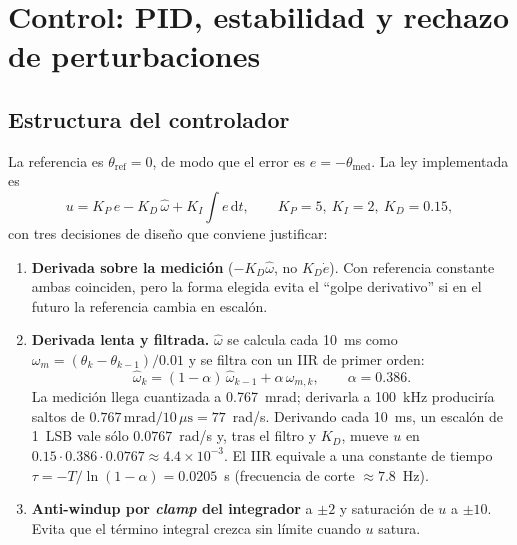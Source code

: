\documentclass[11pt,a4paper]{article}
\newcommand{\dd}{\mathrm{d}}
\begin{document}
\section{Control: PID, estabilidad y rechazo de perturbaciones}\label{sec:control}
\subsection{Estructura del controlador}
La referencia es $\theta_{\mathrm{ref}}=0$, de modo que el error es $e=-\theta_{\mathrm{med}}$. La
ley implementada es
\begin{equation}
u = K_P\,e - K_D\,\hat\omega + K_I\!\int e\,\dd t,\qquad
K_P=5,\ K_I=2,\ K_D=0.15 ,
\end{equation}
con tres decisiones de dise\~no que conviene justificar:

\begin{enumerate}[leftmargin=1.6em]
\item \textbf{Derivada sobre la medici\'on} ($-K_D\hat\omega$, no $K_D\dot e$). Con
referencia constante ambas coinciden, pero la forma elegida evita el ``golpe derivativo''
si en el futuro la referencia cambia en escal\'on.
\item \textbf{Derivada lenta y filtrada.} $\hat\omega$ se calcula cada 10~ms como
$\omega_m=(\theta_k-\theta_{k-1})/0.01$ y se filtra con un IIR de primer orden:
\begin{equation}
\hat\omega_k=(1-\alpha)\,\hat\omega_{k-1}+\alpha\,\omega_{m,k},\qquad \alpha=0.386 .
\label{eq:iir}
\end{equation}
La medici\'on llega cuantizada a 0.767~mrad; derivarla a 100~kHz producir\'ia saltos de
$0.767\,\mathrm{mrad}/10\,\mu\mathrm{s}=77$~rad/s. Derivando cada 10~ms, un escal\'on de
1~LSB vale s\'olo $0.0767$~rad/s y, tras el filtro y $K_D$, mueve $u$ en
$0.15\cdot0.386\cdot0.0767\approx4.4\times10^{-3}$. El IIR equivale a una constante de tiempo
$\tau=-T/\ln(1-\alpha)=0.0205$~s (frecuencia de corte $\approx7.8$~Hz).
\item \textbf{Anti-windup por \emph{clamp} del integrador} a $\pm2$ y saturaci\'on de $u$ a
$\pm10$. Evita que el t\'ermino integral crezca sin l\'imite cuando $u$ satura.
\end{enumerate}
\end{document}
